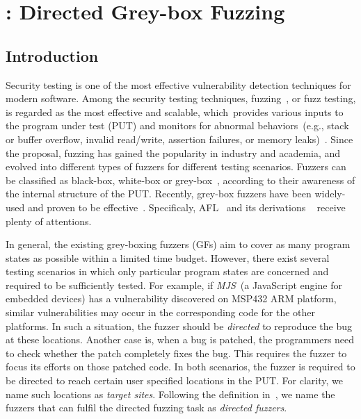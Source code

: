 
\chapter{\dFOT: Directed Grey-box Fuzzing} \label{ch:dfot}


\section{Introduction}






Security testing is one of the most effective vulnerability detection techniques for modern software.
Among the security testing techniques, fuzzing~\cite{fuzzing1990}, or fuzz testing, is regarded as the most effective and scalable, which~provides various inputs to the program under test (PUT) and monitors for abnormal behaviors~(e.g., stack or buffer overflow, invalid read/write, assertion failures, or memory leaks)~\cite{fuzzSurvey}. 
Since the proposal, fuzzing has gained the popularity in industry and academia, and evolved into different types of fuzzers for different testing scenarios.
Fuzzers can be classified as black-box, white-box or grey-box~\cite{chen2018systematic}, according to their awareness of the internal structure of the PUT.
Recently, grey-box fuzzers have been widely-used and proven to be effective~\cite{Bohme:2016:CGF}.
Specificaly, AFL~\cite{afl} and its derivations ~\cite{Bohme:2016:CGF,Bohme:2017:DGF,junjie:2017sp:skyfire,2017arXiv170907101L,CollAFL,Angora} receive plenty of attentions.



In general, the existing grey-boxing fuzzers (GFs) aim to cover as many program states as possible within a limited time budget.
However, there exist several testing scenarios in which only particular program states are concerned and required to be sufficiently tested. 
For example, if \emph{MJS}~\cite{mjs}(a JavaScript engine for embedded devices) has a vulnerability discovered on MSP432 ARM platform, similar vulnerabilities may occur in the corresponding code for the other platforms.
In such a situation, the fuzzer should be \emph{directed} to reproduce the bug at these locations.
Another case is, when a bug is patched, the programmers need to check whether the patch completely fixes the bug. 
This requires the fuzzer to focus its efforts on those patched code.
In both scenarios, the fuzzer is required to be directed to reach certain user specified locations in the PUT.
For clarity, we name such locations as \emph{target sites}.
Following the definition in~\cite{Bohme:2017:DGF}, we name the fuzzers that can fulfil the directed fuzzing task as \emph{directed fuzzers}.




